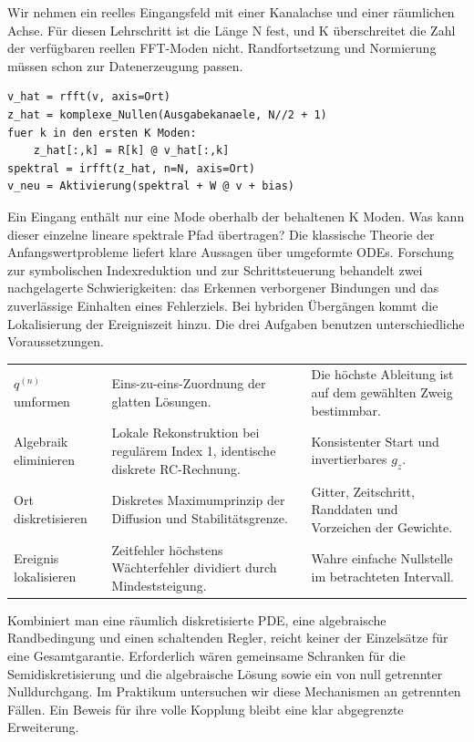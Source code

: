 Wir nehmen ein reelles Eingangsfeld mit einer Kanalachse und einer räumlichen Achse. Für diesen Lehrschritt ist die Länge N fest, und K überschreitet die Zahl der verfügbaren reellen FFT-Moden nicht. Randfortsetzung und Normierung müssen schon zur Datenerzeugung passen.
{\small\begin{verbatim}
v_hat = rfft(v, axis=Ort)
z_hat = komplexe_Nullen(Ausgabekanaele, N//2 + 1)
fuer k in den ersten K Moden:
    z_hat[:,k] = R[k] @ v_hat[:,k]
spektral = irfft(z_hat, n=N, axis=Ort)
v_neu = Aktivierung(spektral + W @ v + bias)
\end{verbatim}}
Ein Eingang enthält nur eine Mode oberhalb der behaltenen K Moden. Was kann dieser einzelne lineare spektrale Pfad übertragen?
Die klassische Theorie der Anfangswertprobleme liefert klare Aussagen über umgeformte ODEs. Forschung zur symbolischen Indexreduktion und zur Schrittsteuerung behandelt zwei nachgelagerte Schwierigkeiten: das Erkennen verborgener Bindungen und das zuverlässige Einhalten eines Fehlerziels. Bei hybriden Übergängen kommt die Lokalisierung der Ereigniszeit hinzu. Die drei Aufgaben benutzen unterschiedliche Voraussetzungen.
{\tblstart\begin{tabularx}{\linewidth}{@{}P{34mm}YY@{}}\toprule
{}&&\\\midrule
\(q^{(n)}\) umformen&Eins-zu-eins-Zuordnung der glatten Lösungen.&Die höchste Ableitung ist auf dem gewählten Zweig bestimmbar.\\
Algebraik eliminieren&Lokale Rekonstruktion bei regulärem Index 1, identische diskrete RC-Rechnung.&Konsistenter Start und invertierbares \(g_z\).\\
Ort diskretisieren&Diskretes Maximumprinzip der Diffusion und Stabilitätsgrenze.&Gitter, Zeitschritt, Randdaten und Vorzeichen der Gewichte.\\
Ereignis lokalisieren&Zeitfehler höchstens Wächterfehler dividiert durch Mindeststeigung.&Wahre einfache Nullstelle im betrachteten Intervall.\\\bottomrule\end{tabularx}\par}
Kombiniert man eine räumlich diskretisierte PDE, eine algebraische Randbedingung und einen schaltenden Regler, reicht keiner der Einzelsätze für eine Gesamtgarantie. Erforderlich wären gemeinsame Schranken für die Semidiskretisierung und die algebraische Lösung sowie ein von null getrennter Nulldurchgang. Im Praktikum untersuchen wir diese Mechanismen an getrennten Fällen. Ein Beweis für ihre volle Kopplung bleibt eine klar abgegrenzte Erweiterung.
